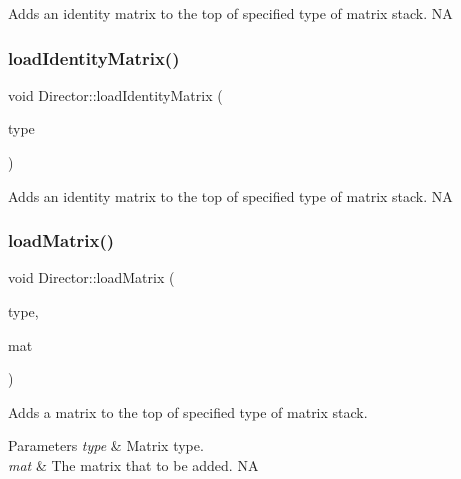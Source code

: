 Adds an identity matrix to the top of specified type of matrix stack.  NA \mbox{\label{classDirector_a3491e578d2d80809b44892144bd6645a}} 
\subsubsection{\texorpdfstring{load\+Identity\+Matrix()}{loadIdentityMatrix()}\hspace{0.1cm}{\footnotesize\ttfamily [2/2]}}
{\footnotesize\ttfamily void Director\+::load\+Identity\+Matrix (\begin{DoxyParamCaption}\item[{\hyperlink{group__base_ga4d146cef7130a8f3a953d46964ea3905}{M\+A\+T\+R\+I\+X\+\_\+\+S\+T\+A\+C\+K\+\_\+\+T\+Y\+PE}}]{type }\end{DoxyParamCaption})}

Adds an identity matrix to the top of specified type of matrix stack.  NA \mbox{\label{classDirector_a95ecc03e54db47241c59ad68c4eb9ec2}} 
\subsubsection{\texorpdfstring{load\+Matrix()}{loadMatrix()}\hspace{0.1cm}{\footnotesize\ttfamily [1/2]}}
{\footnotesize\ttfamily void Director\+::load\+Matrix (\begin{DoxyParamCaption}\item[{\hyperlink{group__base_ga4d146cef7130a8f3a953d46964ea3905}{M\+A\+T\+R\+I\+X\+\_\+\+S\+T\+A\+C\+K\+\_\+\+T\+Y\+PE}}]{type,  }\item[{const \hyperlink{classMat4}{Mat4} \&}]{mat }\end{DoxyParamCaption})}

Adds a matrix to the top of specified type of matrix stack.


\begin{DoxyParams}{Parameters}
{\em type} & Matrix type. \\
\hline
{\em mat} & The matrix that to be added.  NA \\
\hline
\end{DoxyParams}
\mbox{\label{classDirector_a95ecc03e54db47241c59ad68c4eb9ec2}} 
